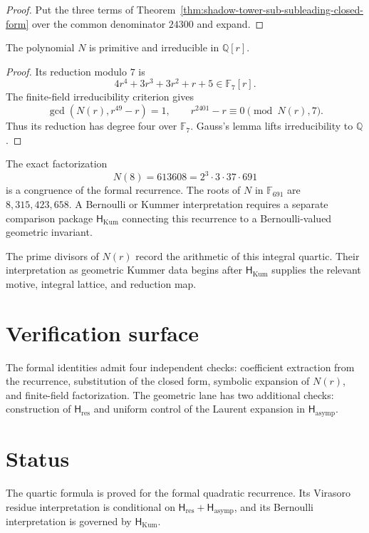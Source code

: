 \begin{proof}
Put the three terms of
Theorem~\ref{thm:shadow-tower-sub-subleading-closed-form} over the
common denominator \(24300\) and expand.
\end{proof}

\begin{lemma}
\label{lem:gamma-numerator-irreducible}
\ClaimStatusProvedHere
The polynomial \(N\) is primitive and irreducible in
\(\mathbb Q[r]\).
\end{lemma}

\begin{proof}
Its reduction modulo \(7\) is
\[
 4r^4+3r^3+3r^2+r+5\in\mathbb F_7[r].
\]
The finite-field irreducibility criterion gives
\[
 \gcd\!\left(N(r),r^{49}-r\right)=1,
 \qquad
 r^{2401}-r\equiv0\pmod{N(r),7}.
\]
Thus its reduction has degree four over \(\mathbb F_7\).  Gauss's
lemma lifts irreducibility to \(\mathbb Q\).
\end{proof}

\begin{remark}
\label{rem:gamma-691-emergence-sporadic}
\ClaimStatusProvedHere
The exact factorization
\[
 N(8)=613608=2^3\cdot3\cdot37\cdot691
\]
is a congruence of the formal recurrence.  The roots of \(N\) in
\(\mathbb F_{691}\) are
\(8,315,423,658\).  A Bernoulli or Kummer interpretation requires a
separate comparison package \(\mathsf H_{\mathrm{Kum}}\) connecting
this recurrence to a Bernoulli-valued geometric invariant.
\end{remark}

\begin{remark}
\label{rem:gamma-irregular-primes-dense-but-structureless}
The prime divisors of \(N(r)\) record the arithmetic of this integral
quartic.  Their interpretation as geometric Kummer data begins after
\(\mathsf H_{\mathrm{Kum}}\) supplies the relevant motive, integral
lattice, and reduction map.
\end{remark}

\section{Verification surface}
\label{sec:stss-verification}

The formal identities admit four independent checks: coefficient
extraction from the recurrence, substitution of the closed form,
symbolic expansion of \(N(r)\), and finite-field factorization.  The
geometric lane has two additional checks: construction of
\(\mathsf H_{\mathrm{res}}\) and uniform control of the Laurent
expansion in \(\mathsf H_{\mathrm{asymp}}\).

\section{Status}
\label{sec:stss-summary}

The quartic formula is proved for the formal quadratic recurrence.
Its Virasoro residue interpretation is conditional on
\(\mathsf H_{\mathrm{res}}+\mathsf H_{\mathrm{asymp}}\), and its
Bernoulli interpretation is governed by \(\mathsf H_{\mathrm{Kum}}\).
